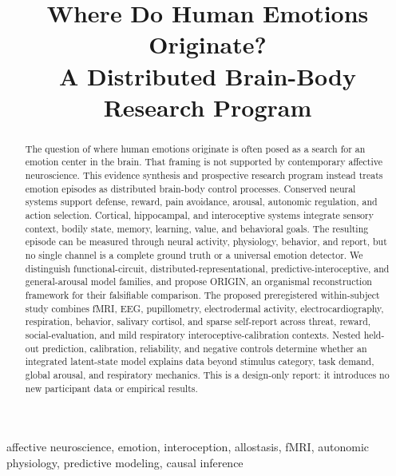 \documentclass[conference]{IEEEtran}
\begin{document}
\title{Where Do Human Emotions Originate?\\
A Distributed Brain-Body Research Program}

\author{
}

\maketitle

\begin{abstract}
The question of where human emotions originate is often posed as a search for an emotion center in the brain. That framing is not supported by contemporary affective neuroscience. This evidence synthesis and prospective research program instead treats emotion episodes as distributed brain-body control processes. Conserved neural systems support defense, reward, pain avoidance, arousal, autonomic regulation, and action selection. Cortical, hippocampal, and interoceptive systems integrate sensory context, bodily state, memory, learning, value, and behavioral goals. The resulting episode can be measured through neural activity, physiology, behavior, and report, but no single channel is a complete ground truth or a universal emotion detector. We distinguish functional-circuit, distributed-representational, predictive-interoceptive, and general-arousal model families, and propose ORIGIN, an organismal reconstruction framework for their falsifiable comparison. The proposed preregistered within-subject study combines fMRI, EEG, pupillometry, electrodermal activity, electrocardiography, respiration, behavior, salivary cortisol, and sparse self-report across threat, reward, social-evaluation, and mild respiratory interoceptive-calibration contexts. Nested held-out prediction, calibration, reliability, and negative controls determine whether an integrated latent-state model explains data beyond stimulus category, task demand, global arousal, and respiratory mechanics. This is a design-only report: it introduces no new participant data or empirical results.
\end{abstract}

\begin{IEEEkeywords}
affective neuroscience, emotion, interoception, allostasis, fMRI, autonomic physiology, predictive modeling, causal inference
\end{IEEEkeywords}
\end{document}

